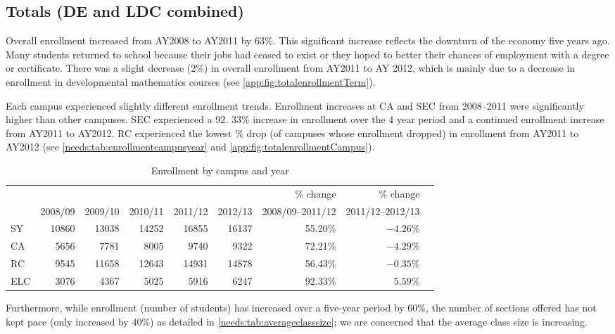 \subsection{Totals (DE and LDC combined)}
Overall enrollment increased from AY2008 to AY2011 by 63\%.
This significant increase reflects the downturn of the economy five years ago.
Many students returned to school because their jobs had ceased to exist or they hoped to better their chances of employment with a degree or certificate.
There was a slight decrease (2\%) in overall enrollment from AY2011 to AY 2012, which is mainly due to a decrease in enrollment in developmental mathematics courses (see \vref{app:fig:totalenrollmentTerm}).

Each campus experienced slightly different enrollment trends.
Enrollment increases at CA and SEC from 2008--2011 were significantly higher than other campuses.
SEC experienced a 92.
33\% increase in enrollment over the 4 year
period and a continued enrollment increase from AY2011 to AY2012.
RC experienced the lowest \% drop (of campuses whose enrollment dropped)  in enrollment from AY2011 to AY2012 (see \vref{needs:tab:enrollmentcampusyear} and \vref{app:fig:totalenrollmentCampus}).

\begin{table}[!htb]
	\centering
	\caption{Enrollment by campus and year}
	\label{needs:tab:enrollmentcampusyear}
	\begin{tabularx}{\linewidth}{l*{8}{R}}
		\toprule
		    &         &         &         &         &         & \% change        & \% change        \\
		    & 2008/09 & 2009/10 & 2010/11 & 2011/12 & 2012/13 & 2008/09--2011/12 & 2011/12--2012/13 \\
		\midrule
		SY  & 10860   & 13038   & 14252   & 16855   & 16137   & 55.20\%          & $-4.26\%$        \\
		CA  & 5656    & 7781    & 8005    & 9740    & 9322    & 72.21\%          & $-4.29\%$        \\
		RC  & 9545    & 11658   & 12643   & 14931   & 14878   & 56.43\%          & $-0.35\%$        \\
		ELC & 3076    & 4367    & 5025    & 5916    & 6247    & 92.33\%          & $5.59\%$         \\
		\bottomrule
	\end{tabularx}
\end{table}

Furthermore, while enrollment (number of students) has increased over a five-year period by 60\%, the number of sections offered has not kept pace (only increased by 40\%) as detailed in \cref{needs:tab:averageclasssize}; we are concerned that the average class size is increasing.

